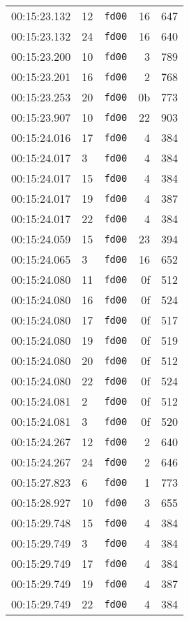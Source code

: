 \documentclass{article}
\begin{document}
\begin{longtable}{lllrr}
00:15:23.132 & 12 & \texttt{fd00} & 16 & 647 \\
00:15:23.132 & 24 & \texttt{fd00} & 16 & 640 \\
00:15:23.200 & 10 & \texttt{fd00} & 3 & 789 \\
00:15:23.201 & 16 & \texttt{fd00} & 2 & 768 \\
00:15:23.253 & 20 & \texttt{fd00} & 0b & 773 \\
00:15:23.907 & 10 & \texttt{fd00} & 22 & 903 \\
00:15:24.016 & 17 & \texttt{fd00} & 4 & 384 \\
00:15:24.017 & 3 & \texttt{fd00} & 4 & 384 \\
00:15:24.017 & 15 & \texttt{fd00} & 4 & 384 \\
00:15:24.017 & 19 & \texttt{fd00} & 4 & 387 \\
00:15:24.017 & 22 & \texttt{fd00} & 4 & 384 \\
00:15:24.059 & 15 & \texttt{fd00} & 23 & 394 \\
00:15:24.065 & 3 & \texttt{fd00} & 16 & 652 \\
00:15:24.080 & 11 & \texttt{fd00} & 0f & 512 \\
00:15:24.080 & 16 & \texttt{fd00} & 0f & 524 \\
00:15:24.080 & 17 & \texttt{fd00} & 0f & 517 \\
00:15:24.080 & 19 & \texttt{fd00} & 0f & 519 \\
00:15:24.080 & 20 & \texttt{fd00} & 0f & 512 \\
00:15:24.080 & 22 & \texttt{fd00} & 0f & 524 \\
00:15:24.081 & 2 & \texttt{fd00} & 0f & 512 \\
00:15:24.081 & 3 & \texttt{fd00} & 0f & 520 \\
00:15:24.267 & 12 & \texttt{fd00} & 2 & 640 \\
00:15:24.267 & 24 & \texttt{fd00} & 2 & 646 \\
00:15:27.823 & 6 & \texttt{fd00} & 1 & 773 \\
00:15:28.927 & 10 & \texttt{fd00} & 3 & 655 \\
00:15:29.748 & 15 & \texttt{fd00} & 4 & 384 \\
00:15:29.749 & 3 & \texttt{fd00} & 4 & 384 \\
00:15:29.749 & 17 & \texttt{fd00} & 4 & 384 \\
00:15:29.749 & 19 & \texttt{fd00} & 4 & 387 \\
00:15:29.749 & 22 & \texttt{fd00} & 4 & 384 \\

\end{longtable}
\end{document}
